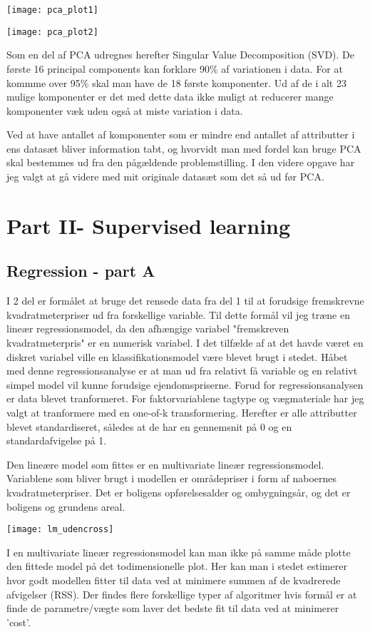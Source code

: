 \documentclass{report}
\begin{document}
\texttt{[image: pca\_plot1]}

\texttt{[image: pca\_plot2]}

Som en del af PCA udregnes herefter Singular Value Decomposition (SVD).
De første 16 principal components kan forklare 90\% af variationen i data. For at kommme over 95\% skal man have de 18 første komponenter. Ud af de i alt 23 mulige komponenter er det med dette data ikke muligt at reducerer mange komponenter væk uden også at miste variation i data. 

Ved at have antallet af komponenter som er mindre end antallet af attributter i ens datasæt bliver information tabt, og hvorvidt man med fordel kan bruge PCA skal bestemmes ud fra den pågældende problemstilling. I den videre opgave har jeg valgt at gå videre med mit originale datasæt som det så ud før PCA. 

\chapter{Part II- Supervised learning}

\section{Regression - part A}
I 2 del er formålet at bruge det rensede data fra del 1 til at forudsige fremskrevne kvadratmeterpriser ud fra forskellige variable. Til dette formål vil jeg træne en lineær regressionsmodel, da den afhængige variabel "fremskreven kvadratmeterpris" er en numerisk variabel. I det tilfælde af at det havde været en diskret variabel ville en klassifikationsmodel være blevet brugt i stedet.
Håbet med denne regressionsanalyse er at man ud fra relativt få variable og en relativt simpel model vil kunne forudsige ejendomspriserne. 
Forud for regressionsanalysen er data blevet tranformeret. For faktorvariablene tagtype og vægmateriale har jeg valgt at tranformere med en one-of-k transformering. Herefter er alle attributter blevet standardiseret, således at de har en gennemsnit på 0 og en standardafvigelse på 1. 

Den lineære model som fittes er en multivariate lineær regressionsmodel. 
Variablene som bliver brugt i modellen er områdepriser i form af naboernes kvadratmeterpriser. Det er boligens opførelsesalder og ombygningsår, og det er boligens og grundens areal. 

\texttt{[image: lm\_udencross]}

I en multivariate lineær regressionsmodel kan man ikke på samme måde plotte den fittede model på det todimensionelle plot. Her kan man i stedet estimerer hvor godt modellen fitter til data ved at minimere summen af de kvadrerede afvigelser (RSS). 
Der findes flere forskellige typer af algoritmer hvis formål er at finde de parametre/vægte som laver det bedste fit til data ved at minimerer 'cost'. 
\end{document}
